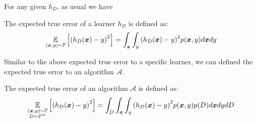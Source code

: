 For any given $h_D$, as usual we have

\begin{df}
    The expected true error of a learner $h_D$ is defined as:
    \begin{equation}
        \operatorname*{\mathbb{E}}_{(\boldsymbol{x}, y) \sim \operatorname*{\mathbb{P}}}\left[{(h_D(\boldsymbol{x}) - y)}^2\right] = \int_{\boldsymbol{x}} \int_y {(h_D(\boldsymbol{x}) - y)}^2
        p(\boldsymbol{x}, y) d\boldsymbol{x} dy
    \end{equation}
\end{df}

Similar to the above expected true error \wrt to a specific learner, we can defined the expected true error
\wrt to an algorithm $\mathcal{A}$.

\begin{df}
    The expected true error of an algorithm $\mathcal{A}$ is defined as:
    \begin{equation}
        \operatorname*{\mathbb{E}}_{\substack{(\boldsymbol{x}, y) \sim \operatorname*{\mathbb{P}} \\ D \sim \operatorname*{\mathbb{P}}^m}}\left[{(h_D(\boldsymbol{x}) - y)}^2\right] =
        \int_D \int_{\boldsymbol{x}} \int_y {(h_D(\boldsymbol{x}) - y)}^2 p(\boldsymbol{x}, y) p(D) d\boldsymbol{x} dy dD
    \end{equation}
\end{df}

